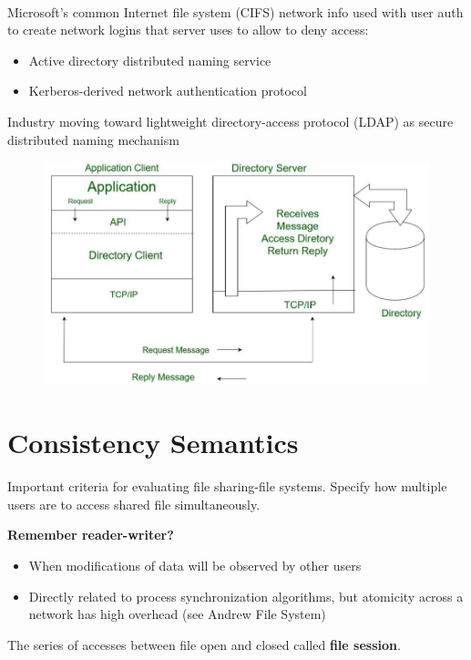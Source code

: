 \paragraph{}

Microsoft’s common Internet file system (CIFS) network info used with user
auth to create network logins that server uses to allow to deny access:

\begin{itemize}
    \item Active directory distributed naming service
    \item Kerberos-derived network authentication protocol
\end{itemize}

Industry moving toward lightweight directory-access protocol (LDAP) as
secure distributed naming mechanism

\begin{figure}[h!]
    \centering
    \includegraphics[width=0.6\linewidth]{img/sdfbfbs.png}
\end{figure}



\section{Consistency Semantics}

Important criteria for evaluating file sharing-file systems. Specify how multiple users are to access shared file simultaneously.

\textbf{Remember reader-writer?}
\begin{itemize}
    \item [] When modifications of data will be observed by other users
    \item [] Directly related to process synchronization algorithms, but atomicity across a network has high overhead (see Andrew File System)
\end{itemize}

The series of accesses between file open and closed called \textbf{file session}.

